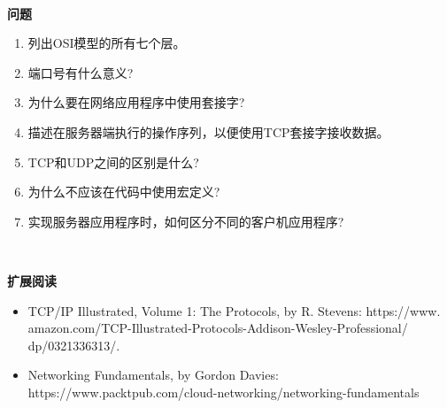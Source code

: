 \noindent\textbf{}\ \par
\textbf{问题} \ \par
\begin{enumerate}
	\item 列出OSI模型的所有七个层。
	\item 端口号有什么意义?
	\item 为什么要在网络应用程序中使用套接字?
	\item 描述在服务器端执行的操作序列，以便使用TCP套接字接收数据。
	\item TCP和UDP之间的区别是什么?
	\item 为什么不应该在代码中使用宏定义?
	\item 实现服务器应用程序时，如何区分不同的客户机应用程序?
\end{enumerate}

\noindent\textbf{}\ \par
\textbf{扩展阅读} \ \par
\begin{itemize}
	\item TCP/IP Illustrated, Volume 1: The Protocols, by R. Stevens:  https:/​/​www.​amazon.com/​TCP-​Illustrated-​Protocols-​Addison-​Wesley-​Professional/​dp/0321336313/​ .
	\item Networking Fundamentals, by Gordon Davies: https://www.packtpub.com/cloud-networking/networking-fundamentals
\end{itemize}

\newpage








































